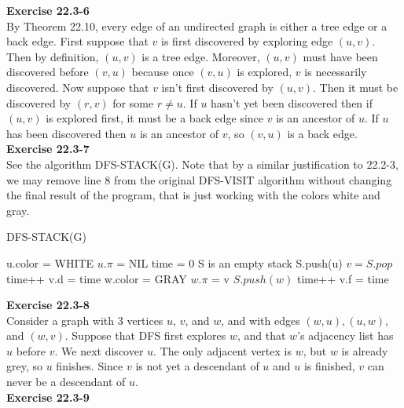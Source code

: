 \documentclass{article}
\begin{document}
\noindent\textbf{Exercise 22.3-6}\\

By Theorem 22.10, every edge of an undirected graph is either a tree edge or a back edge.  First suppose that $v$ is first discovered by exploring edge $(u,v)$.  Then by definition, $(u,v)$ is a tree edge.  Moreover, $(u,v)$ must have been discovered before $(v,u)$ because once $(v,u)$ is explored, $v$ is necessarily discovered.  Now suppose that $v$ isn't first discovered by $(u,v)$.  Then it must be discovered by $(r,v)$ for some $r \neq u$.  If $u$ hasn't yet been discovered then if $(u,v)$ is explored first, it must be a back edge since $v$ is an ancestor of $u$. If $u$ has been discovered then $u$ is an ancestor of $v$, so $(v,u)$ is a back edge. \\

\noindent\textbf{Exercise 22.3-7}\\

See the algorithm DFS-STACK(G). Note that by a similar justification to 22.2-3, we may remove line 8 from the original DFS-VISIT algorithm without changing the final result of the program, that is just working with the colors white and gray.
\begin{algorithm}
\caption{DFS-STACK(G)}
\begin{algorithmic}
\State u.color = WHITE
\State $u.\pi$ = NIL
\EndFor
\State time = 0
\State S is an empty stack
\State S.push(u)
\State $v = S.pop$
\State time++
\State v.d = time
\State w.color = GRAY
\State $w.\pi$ = v
\State $S.push(w)$
\EndIf
\EndFor
\State time++
\State v.f = time
\EndWhile
\EndWhile
\end{algorithmic}
\end{algorithm}

\noindent\textbf{Exercise 22.3-8}\\

Consider a graph with 3 vertices $u$, $v$, and $w$, and with edges $(w,u), (u,w)$, and $(w,v)$.  Suppose that DFS first explores $w$, and that $w$'s adjacency list has $u$ before $v$.  We next discover $u$.  The only adjacent vertex is $w$, but $w$ is already grey, so $u$ finishes. Since $v$ is not yet a descendant of $u$ and $u$ is finished, $v$ can never be a descendant of $u$. \\

\noindent\textbf{Exercise 22.3-9}\\
\end{document}
